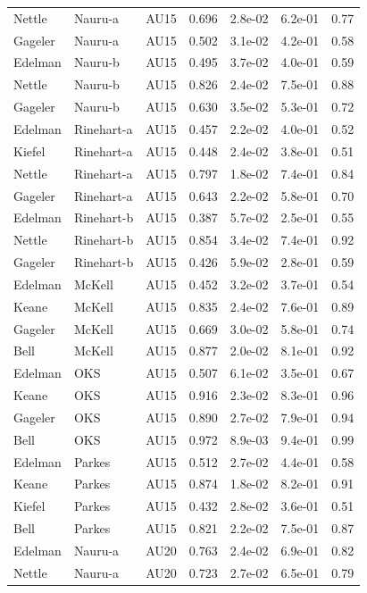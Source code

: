 \documentclass{monashthesis}
\begin{document}
\begin{center}
\begin{longtable}{lllllll}
Nettle & Nauru-a & AU15 & 0.696 & 2.8e-02 & 6.2e-01 & 0.77 \\
Gageler & Nauru-a & AU15 & 0.502 & 3.1e-02 & 4.2e-01 & 0.58 \\
Edelman & Nauru-b & AU15 & 0.495 & 3.7e-02 & 4.0e-01 & 0.59 \\
Nettle & Nauru-b & AU15 & 0.826 & 2.4e-02 & 7.5e-01 & 0.88 \\
Gageler & Nauru-b & AU15 & 0.630 & 3.5e-02 & 5.3e-01 & 0.72 \\
Edelman & Rinehart-a & AU15 & 0.457 & 2.2e-02 & 4.0e-01 & 0.52 \\
Kiefel & Rinehart-a & AU15 & 0.448 & 2.4e-02 & 3.8e-01 & 0.51 \\
Nettle & Rinehart-a & AU15 & 0.797 & 1.8e-02 & 7.4e-01 & 0.84 \\
Gageler & Rinehart-a & AU15 & 0.643 & 2.2e-02 & 5.8e-01 & 0.70 \\
Edelman & Rinehart-b & AU15 & 0.387 & 5.7e-02 & 2.5e-01 & 0.55 \\
Nettle & Rinehart-b & AU15 & 0.854 & 3.4e-02 & 7.4e-01 & 0.92 \\
Gageler & Rinehart-b & AU15 & 0.426 & 5.9e-02 & 2.8e-01 & 0.59 \\
Edelman & McKell & AU15 & 0.452 & 3.2e-02 & 3.7e-01 & 0.54 \\
Keane & McKell & AU15 & 0.835 & 2.4e-02 & 7.6e-01 & 0.89 \\
Gageler & McKell & AU15 & 0.669 & 3.0e-02 & 5.8e-01 & 0.74 \\
Bell & McKell & AU15 & 0.877 & 2.0e-02 & 8.1e-01 & 0.92 \\
Edelman & OKS & AU15 & 0.507 & 6.1e-02 & 3.5e-01 & 0.67 \\
Keane & OKS & AU15 & 0.916 & 2.3e-02 & 8.3e-01 & 0.96 \\
Gageler & OKS & AU15 & 0.890 & 2.7e-02 & 7.9e-01 & 0.94 \\
Bell & OKS & AU15 & 0.972 & 8.9e-03 & 9.4e-01 & 0.99 \\
Edelman & Parkes & AU15 & 0.512 & 2.7e-02 & 4.4e-01 & 0.58 \\
Keane & Parkes & AU15 & 0.874 & 1.8e-02 & 8.2e-01 & 0.91 \\
Kiefel & Parkes & AU15 & 0.432 & 2.8e-02 & 3.6e-01 & 0.51 \\
Bell & Parkes & AU15 & 0.821 & 2.2e-02 & 7.5e-01 & 0.87 \\
Edelman & Nauru-a & AU20 & 0.763 & 2.4e-02 & 6.9e-01 & 0.82 \\
Nettle & Nauru-a & AU20 & 0.723 & 2.7e-02 & 6.5e-01 & 0.79 \\

\end{longtable}
\end{center}
\end{document}

